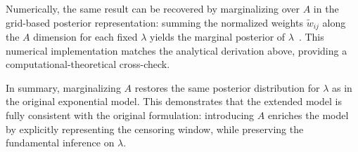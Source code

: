 Numerically, the same result can be recovered by marginalizing over $A$ in the grid-based posterior representation: summing the normalized weights $\tilde w_{ij}$ along the $A$ dimension for each fixed $\lambda$ yields the marginal posterior of $\lambda$~\cite{ORMEROD201145, cowles2009reparameterized}. This numerical implementation matches the analytical derivation above, providing a computational-theoretical cross-check.

In summary, marginalizing $A$ restores the same posterior distribution for $\lambda$ as in the original exponential model. This demonstrates that the extended model is fully consistent with the original formulation: introducing $A$ enriches the model by explicitly representing the censoring window, while preserving the fundamental inference on $\lambda$.